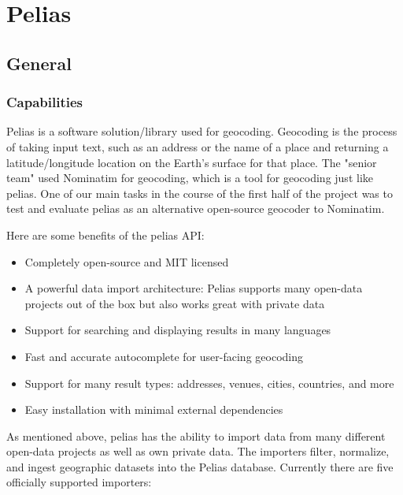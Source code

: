
\section{Pelias}
\subsection{General}
\subsubsection{Capabilities}
Pelias is a software solution/library used for geocoding. Geocoding is the process of taking input text, such as an address or the name of a place and returning a latitude/longitude location on the Earth's surface for that place.
The "senior team" used Nominatim for geocoding, which is a tool for geocoding just like pelias. One of our main tasks  in the course of the first half of the project was to test and evaluate pelias as an alternative open-source geocoder to Nominatim.

Here are some benefits of the pelias API:
\begin{itemize}
\item Completely open-source and MIT licensed
\item A powerful data import architecture: Pelias supports many open-data projects out of the box but also works great with private data
\item Support for searching and displaying results in many languages
\item Fast and accurate autocomplete for user-facing geocoding
\item Support for many result types: addresses, venues, cities, countries, and more
\item Easy installation with minimal external dependencies
\end{itemize}

As mentioned above, pelias has the ability to import data from many different open-data projects as well as own private data. The importers filter, normalize, and ingest geographic datasets into the Pelias database. Currently there are five officially supported importers:

